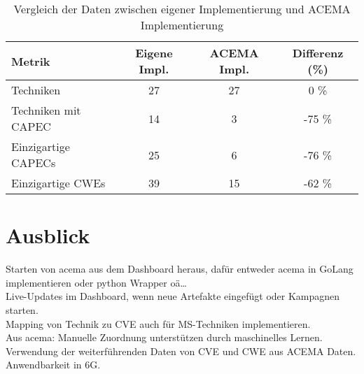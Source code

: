 \begin{table}[H]
    \centering
    \caption{Vergleich der Daten zwischen eigener Implementierung und ACEMA Implementierung}
    \begin{tabular}{|l|c|c|c|}
        \hline
        \textbf{Metrik}     & \textbf{Eigene Impl.} & \textbf{ACEMA Impl.} & \textbf{Differenz (\%)} \\
        \hline
        Techniken           & 27                    & 27                   & 0 \%                    \\
        \hline
        Techniken mit CAPEC & 14                    & 3                    & -75 \%                  \\
        \hline
        Einzigartige CAPECs & 25                    & 6                    & -76 \%                  \\
        \hline
        Einzigartige CWEs   & 39                    & 15                   & -62 \%                  \\
        \hline
    \end{tabular}
    \label{tab:comparison_with_diff}
\end{table}

\section{Ausblick}
\label{sec:ausblick}
Starten von \gls{acema} aus dem Dashboard heraus, dafür entweder \gls{acema} in GoLang implementieren oder python Wrapper oä\dots \\
Live-Updates im Dashboard, wenn neue Artefakte eingefügt oder Kampagnen starten. \\
Mapping von Technik zu CVE auch für MS-Techniken implementieren. \\
Aus \gls{acema}: Manuelle Zuordnung unterstützen durch maschinelles Lernen. \\
Verwendung der weiterführenden Daten von CVE und CWE aus ACEMA Daten. \\
Anwendbarkeit in 6G.

